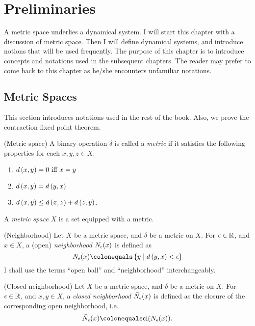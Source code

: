 \documentclass[12pt,twoside,draft]{book}
\begin{document}
\chapter{Preliminaries}
A metric space underlies a dynamical system.
I will start this chapter with a discussion of metric space.
Then I will define dynamical systems, and introduce notions that will be used frequently.
The purpose of this chapter is to introduce concepts and notations used in the subsequent chapters. 
The reader may prefer to come back to this chapter as he/she encounters unfamiliar notations.

\section{Metric Spaces}
This section introduces notations used in the rest of the book.
Also, we prove the contraction fixed point theorem.

\begin{definition}
  (Metric space)
  A binary operation $\delta$ is called a \textit{metric} if it satisfies the following properties for each $x,y,z \in X$:
  \begin{enumerate}
    \item $d\left( x,y \right) = 0 \mbox{ iff } x = y$
    \item $d\left( x,y \right) = d\left( y,x \right)$
    \item $d\left( x,y \right) \leq d\left( x,z \right) + d\left( z,y \right)$.
  \end{enumerate}
  A \textit{metric space} $X$ is a set equipped with a metric.
\end{definition}

\begin{definition}
  (Neighborhood)
  Let $X$ be a metric space, and $\delta$ be a metric on $X$.
  For $\epsilon \in \mathbb{R}$, and $x \in X$, a (open) \textit{neighborhood} $N_\epsilon(x)$ is defined as 
  \begin{equation*}
    \oball{\epsilon}{x} \ceq \setst{y}{\metric{y,x} < \epsilon}
  \end{equation*}
  I shall use the terms ``open ball'' and ``neighborhood'' interchangeably.
\end{definition}

\begin{definition}
  (Closed neighborhood)
  Let $X$ be a metric space, and $\delta$ be a metric on $X$.
  For $\epsilon \in \mathbb{R}$, and $x,y \in X$, a \textit{closed neighborhood} $\bar N_\epsilon(x)$ is defined as the closure of the corresponding open neighborhood, i.e.
  \begin{equation*}
    \cball{\epsilon}{x} \ceq \cl(\oball{\epsilon}{x}).
  \end{equation*}
\end{definition}
\end{document}
